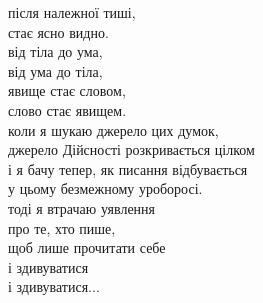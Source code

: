 після належної тиші,\\
стає ясно видно.\\

від тіла до ума,\\
від ума до тіла,\\
явище стає словом,\\
слово стає явищем.\\

коли я шукаю джерело цих думок,\\
джерело Дійсності розкривається цілком\\
і я бачу тепер, як писання відбувається\\
у цьому безмежному уроборосі.\\

тоді я втрачаю уявлення\\
про те, хто пише,\\
щоб лише прочитати себе\\
і здивуватися\\
і здивуватися...\\
